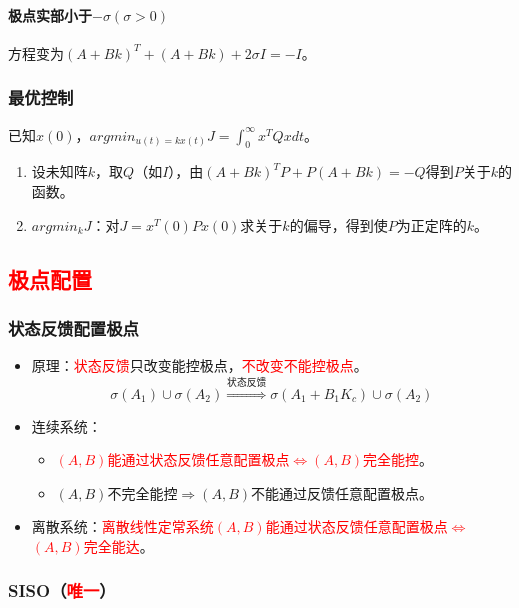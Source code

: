 \documentclass[
12pt, %
a4paper, 
oneside, %
]{scrartcl}
\begin{document}
\paragraph{极点实部小于$ -\sigma(\sigma > 0) $}
方程变为$ (A + B k)^T + (A + B k) + 2 \sigma I = -I $。
\subsubsection[最优控制]{最优控制}
已知$ x(0) $，$ argmin_{u(t) = k x(t)} J = \int_{0}^{\infty} x^T Q x d t $。
\begin{enumerate}
\item 设未知阵$ k $，取$ Q $（如$ I $），由$ (A + B k)^T P + P (A + B k) = -Q $得到$ P $关于$ k $的函数。
\item $ argmin_k J $：对$ J = x^T(0) P x(0) $求关于$ k $的偏导，得到使$ P $为正定阵的$ k $。
\end{enumerate}
\subsection[极点配置]{\textcolor{red}{极点配置}}
\subsubsection[状态反馈配置极点]{状态反馈配置极点}
\begin{itemize}
\item 原理：\textcolor{red}{状态反馈}只改变能控极点，\textcolor{red}{不改变不能控极点}。
$$ \sigma(A_1) \cup \sigma(A_2) \overset{\text{状态反馈}}{\Longrightarrow} \sigma(A_1 + B_1 K_c) \cup \sigma(A_2) $$
\item 连续系统：
\begin{itemize}
\item \textcolor{red}{$ (A, B) $能通过状态反馈任意配置极点$ \Leftrightarrow $$ (A, B) $完全能控}。
\item $ (A, B) $不完全能控$ \Rightarrow $$ (A, B) $不能通过反馈任意配置极点。
\end{itemize}
\item 离散系统：\textcolor{red}{离散线性定常系统$ (A, B) $能通过状态反馈任意配置极点$ \Leftrightarrow $$ (A, B) $完全能达}。
\end{itemize}
\subsubsection[SISO]{SISO（\textcolor{red}{唯一}）}
\end{document}
